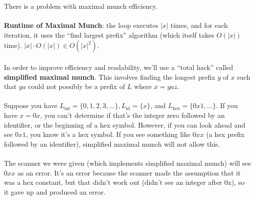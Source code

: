 \documentclass[]{article}
\theoremstyle{definition}
\begin{document}
			There is a problem with maximal munch \textendash{} efficiency.
			\\ \\
			\textbf{Runtime of Maximal Munch}: the loop executes $|x|$ times, and for each iteration, it uses the ``find largest prefix'' algorithm (which itself takes $O(|x|)$ time). $|x| \cdot O(|x|) \in O(|x|^2)$.
			\\ \\
			In order to improve efficiency and readability, we'll use a ``total hack'' called \textbf{simplified maximal munch}. This involves finding the longest prefix $y$ of $x$ such that $ya$ could not possibly be a prefix of $L$ where $x = yaz$.
			\\ \\
			Suppose you have $L_{\text{int}} = \{0, 1, 2, 3, \ldots\}, L_{\text{id}} = \{x\}$, and $L_{\text{hex}} = \{0x1, \ldots\}$. If you have $x = 0x$, you can't determine if that's the integer zero followed by an identifier, or the beginning of a hex symbol. However, if you can look ahead and see $0x1$, you know it's a hex symbol. If you see something like $0xx$ (a hex prefix followed by an identifier), simplified maximal munch will not allow this.
			\\ \\
			The scanner we were given (which implements simplified maximal munch) will see $0xx$ as an error. It's an error because the scanner made the assumption that it was a hex constant, but that didn't work out (didn't see an integer after 0x), so it gave up and produced an error.
\end{document}
